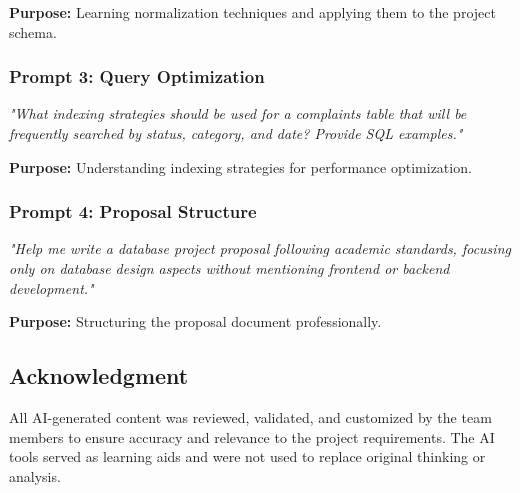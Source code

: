\documentclass[12pt,a4paper]{article}
\begin{document}
\textbf{Purpose:} Learning normalization techniques and applying them to the project schema.

\subsubsection{Prompt 3: Query Optimization}
\textit{"What indexing strategies should be used for a complaints table that will be frequently searched by status, category, and date? Provide SQL examples."}

\textbf{Purpose:} Understanding indexing strategies for performance optimization.

\subsubsection{Prompt 4: Proposal Structure}
\textit{"Help me write a database project proposal following academic standards, focusing only on database design aspects without mentioning frontend or backend development."}

\textbf{Purpose:} Structuring the proposal document professionally.

\subsection{Acknowledgment}

All AI-generated content was reviewed, validated, and customized by the team members to ensure accuracy and relevance to the project requirements. The AI tools served as learning aids and were not used to replace original thinking or analysis.
\end{document}
